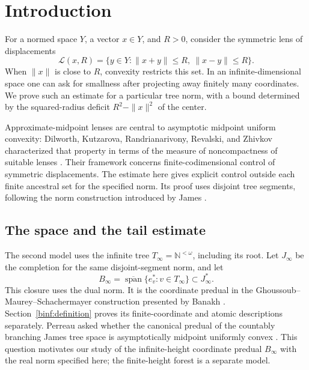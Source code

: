 \section{Introduction}\label{sec:introduction}

For a normed space $Y$, a vector $x\in Y$, and $R>0$, consider the
symmetric lens of displacements
\[
 \mathcal L(x,R)=\{y\in Y:\|x+y\|\le R,\ \|x-y\|\le R\}.
\]
When $\|x\|$ is close to $R$, convexity restricts this set. In an
infinite-dimensional space one can ask for smallness after projecting
away finitely many coordinates. We prove such an estimate for a
particular tree norm, with a bound determined by the squared-radius
deficit $R^2-\|x\|^2$ of the center.

Approximate-midpoint lenses are central to asymptotic midpoint uniform
convexity: Dilworth, Kutzarova, Randrianarivony, Revalski, and Zhivkov
characterized that property in terms of the measure of noncompactness
of suitable lenses
\cite[Theorem~2.1 and Definition~2.2]{DKRRZ2016}. Their framework concerns
finite-codimensional control of symmetric displacements. The estimate
here gives explicit control outside each finite ancestral set for the
specified norm. Its proof uses disjoint tree segments, following the
norm construction introduced by James \cite[p.~739]{James1974}.

\subsection{The space and the tail estimate}



The second model uses the infinite tree $T_\infty=\mathbb N^{<\omega}$,
including its root. Let $J_\infty$ be the completion for the same
disjoint-segment norm, and let
\[
 B_\infty=\overline{\operatorname{span}}\{e_v^*:v\in T_\infty\}
 \subset J_\infty^*.
\]
This closure uses the dual norm. It is the coordinate predual in the
Ghoussoub--Maurey--Schachermayer construction presented by
Banakh \cite[Section~2.II]{Banakh2000}. Section~\ref{binf:definition}
proves its finite-coordinate and atomic descriptions separately.
Perreau asked whether the canonical predual of the countably branching
James tree space is asymptotically midpoint uniformly convex
\cite[Question~6, p.~23 of arXiv v1]{Perreau2021}. This question
motivates our study of the infinite-height coordinate predual $B_\infty$
with the real norm specified here; the finite-height forest is a
separate model.

